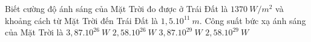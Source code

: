 
\begin{vidu}%
Biết cường độ ánh sáng của Mặt Trời đo được ở Trái Đất là $1370\ W/m^2$ và khoảng cách từ Mặt Trời đến Trái Đất là $1,5.10^{11}\ m$. Công suất bức xạ ánh sáng của Mặt Trời là
\choice
{\True $3,87.10^{26}\ W$}
{$2,58.10^{26}\ W$}
{$3,87.10^{29}\ W$}
{$2,58.10^{29}\ W$}
\end{vidu} 

